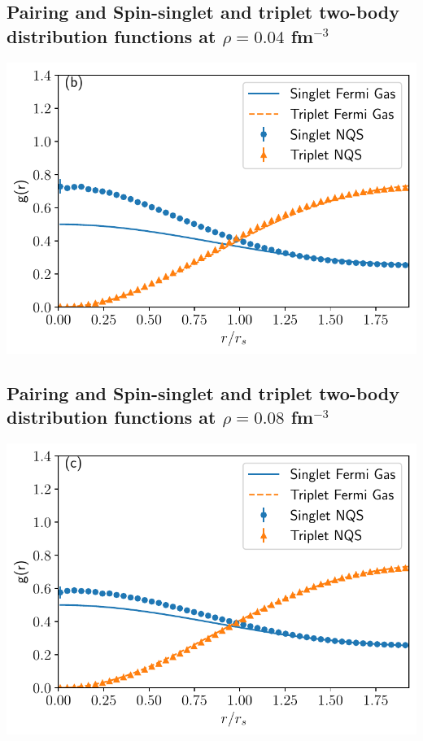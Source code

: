 \documentclass[%
oneside,                 %
final,                   %
10pt]{article}
\begin{document}
\subsection{Pairing and Spin-singlet and triplet two-body distribution functions at $\rho=0.04$ fm$^{-3}$}

\begin{block}{}

\vspace{6mm}

\centerline{\includegraphics[width=0.9\linewidth]{figures/04_tbd.pdf}}

\vspace{6mm}

\end{block}

\subsection{Pairing and Spin-singlet and triplet two-body distribution functions at $\rho=0.08$ fm$^{-3}$}
\begin{block}{}

\vspace{6mm}

\centerline{\includegraphics[width=0.9\linewidth]{figures/08_tbd.pdf}}

\vspace{6mm}

\end{block}
\end{document}

